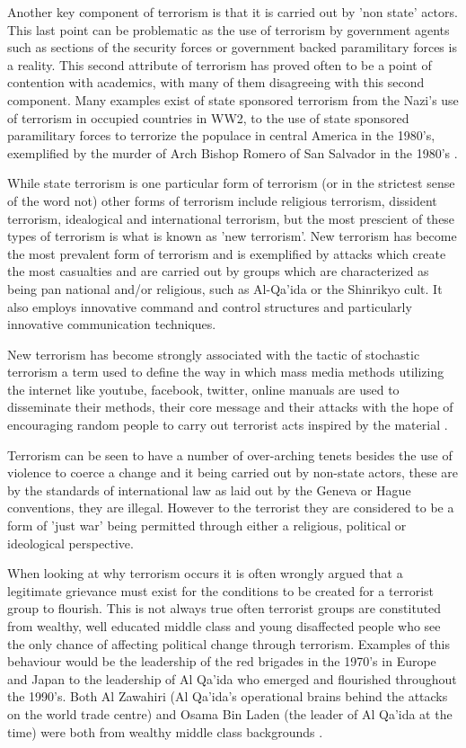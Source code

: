 Another key component of terrorism is that it is carried out by 'non state' actors. This last point can be problematic as the use of terrorism by government agents such as sections of the security forces or government backed paramilitary forces is a reality. This second attribute of terrorism has proved  often to be a point of contention with academics, with many of them disagreeing with this second component. Many examples exist of state sponsored terrorism from the Nazi's use of terrorism in occupied countries in WW2, to the use of state sponsored paramilitary forces to terrorize the populace in central America in the  1980's, exemplified by the murder of Arch Bishop Romero of San Salvador in the 1980's \citep{romero1998violence}. 

While state terrorism is one particular form of terrorism (or in the strictest sense of the word not) other forms of terrorism include religious terrorism, dissident terrorism, idealogical and international terrorism, but the most prescient of these types of terrorism is what is known as 'new terrorism'. New terrorism has become the most prevalent form of terrorism and is exemplified by attacks which create the most casualties and are carried out by groups which are characterized as being pan national and/or religious, such as Al-Qa'ida or the Shinrikyo cult. It also employs innovative command and control structures and particularly innovative communication techniques. 

New terrorism has become strongly associated with the tactic of stochastic terrorism a term used to define the way in which mass media methods utilizing the internet like youtube, facebook, twitter, online manuals are used to disseminate their methods, their core message and their attacks with the hope of encouraging random people to carry out terrorist acts inspired by the material \citep{margulies2016trump}. 

Terrorism can be seen to have a number of over-arching tenets besides the use of violence to coerce a change and it being carried out by non-state actors, these are by the standards of international law as laid out by the Geneva or Hague conventions, they are illegal. However to the terrorist they are considered to be a form of 'just war' being permitted through either a religious, political or ideological perspective.

When looking at why terrorism occurs it is often wrongly argued that a legitimate grievance must exist for the conditions to be created for a terrorist group to flourish. This is not always true often terrorist groups are constituted from wealthy, well educated middle class and young disaffected people who see the only chance of affecting political change through terrorism. Examples of this behaviour would be the leadership of the red brigades in the 1970's in Europe and Japan to the leadership of Al Qa'ida who emerged and flourished throughout the 1990's. Both Al Zawahiri (Al Qa'ida's operational brains behind the attacks on the world trade centre) and Osama Bin Laden (the leader of Al Qa'ida at the time) were both from wealthy middle class backgrounds \citep{henzel2005origins}.

